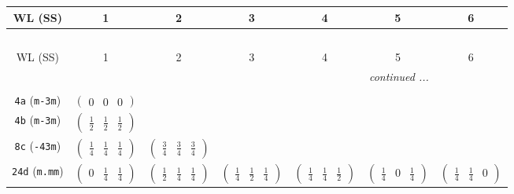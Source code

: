 \documentclass[fleqn,9pt,landscape]{jsarticle}
\begin{document}
\begin{center}
\renewcommand{\arraystretch}{1.2}
\begin{longtable}{ccccccc}
 \hline \hline
WL (SS) & 1 & 2 & 3 & 4 & 5 & 6 \\ \hline \endfirsthead

\multicolumn{6}{l}{\tablename\ \thetable{}} \\
 \hline \hline
WL (SS) & 1 & 2 & 3 & 4 & 5 & 6 \\ \hline \endhead

 \hline \hline
\multicolumn{6}{r}{\footnotesize\it continued ...} \\ \endfoot

 \hline \hline
\multicolumn{6}{r}{} \\ \endlastfoot

{\tt 4a} ({\tt m-3m}) & $ \begin{pmatrix} 0 & 0 & 0 \end{pmatrix} $ & $  $ & $  $ & $  $ & $  $ & $  $ \\ \hline
{\tt 4b} ({\tt m-3m}) & $ \begin{pmatrix} \frac{1}{2} & \frac{1}{2} & \frac{1}{2} \end{pmatrix} $ & $  $ & $  $ & $  $ & $  $ & $  $ \\ \hline
{\tt 8c} ({\tt -43m}) & $ \begin{pmatrix} \frac{1}{4} & \frac{1}{4} & \frac{1}{4} \end{pmatrix} $ & $ \begin{pmatrix} \frac{3}{4} & \frac{3}{4} & \frac{3}{4} \end{pmatrix} $ & $  $ & $  $ & $  $ & $  $ \\ \hline
{\tt 24d} ({\tt m.mm}) & $ \begin{pmatrix} 0 & \frac{1}{4} & \frac{1}{4} \end{pmatrix} $ & $ \begin{pmatrix} \frac{1}{2} & \frac{1}{4} & \frac{1}{4} \end{pmatrix} $ & $ \begin{pmatrix} \frac{1}{4} & \frac{1}{2} & \frac{1}{4} \end{pmatrix} $ & $ \begin{pmatrix} \frac{1}{4} & \frac{1}{4} & \frac{1}{2} \end{pmatrix} $ & $ \begin{pmatrix} \frac{1}{4} & 0 & \frac{1}{4} \end{pmatrix} $ & $ \begin{pmatrix} \frac{1}{4} & \frac{1}{4} & 0 \end{pmatrix} $ \\ \hline

\end{longtable}
\end{center}
\end{document}
